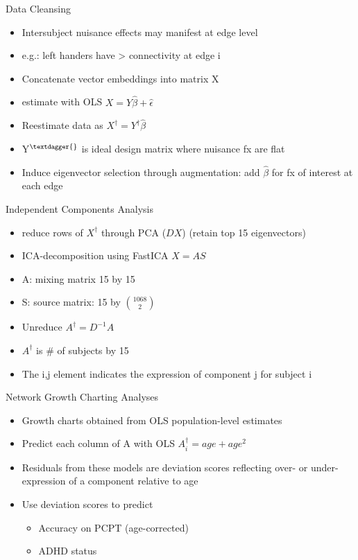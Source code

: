 \documentclass[presentation]{beamer}
\begin{document}
\begin{frame}[label={sec:orgheadline14}]{Data Cleansing}
\begin{itemize}
\item Intersubject nuisance effects may manifest at edge level
\item e.g.: left handers have > connectivity at edge i
\item Concatenate vector embeddings into matrix X
\item estimate with OLS \(X = Y\hat{\beta} + \hat{\epsilon}\)
\item Reestimate data as \(X^{\dagger} = Y^{\dagger}\hat{\beta}\)
\item Y\(^{\textdagger{}}\) is ideal design matrix where nuisance fx are flat
\item Induce eigenvector selection through augmentation: add \(\hat{\beta}\) for fx of interest at each edge
\end{itemize}
\end{frame}
\begin{frame}[label={sec:orgheadline15}]{Independent Components Analysis}
\begin{itemize}
\item reduce rows of \(X^{\dagger}\) through PCA (\(DX\)) (retain top 15 eigenvectors)
\item ICA-decomposition using FastICA \(X=AS\)
\item A: mixing matrix 15 by 15
\item S: source matrix: 15 by \({1068}\choose{2}\)
\item Unreduce \(A^{\dagger}=D^{-1}A\)
\item \(A^{\dagger}\) is \# of subjects by 15
\item The i,j element indicates the expression of component j for subject i
\end{itemize}
\end{frame}
\begin{frame}[label={sec:orgheadline16}]{Network Growth Charting Analyses}
\begin{itemize}
\item Growth charts obtained from OLS population-level estimates
\item Predict each column of A with OLS \(A^{\dagger}_i = age + age^2\)
\item Residuals from these models are \alert{deviation scores} reflecting over- or under- expression of a component relative to age
\item Use \alert{deviation scores} to predict
\begin{itemize}
\item Accuracy on PCPT (age-corrected)
\item ADHD status
\end{itemize}
\end{itemize}
\end{frame}
\end{document}

